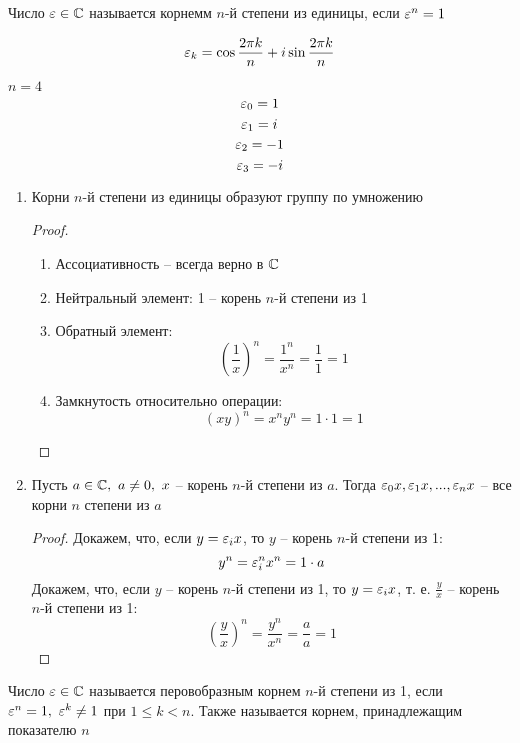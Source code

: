 \begin{definition}
    Число $ \varepsilon \in \mathbb{C} $ называется корнемм $n$-й степени из единицы, если $ \varepsilon^n = 1 $
\end{definition}

\begin{notation}
    $$ \varepsilon_k = \cos \frac{2 \pi k}n + i \sin \frac{2 \pi k}n $$
\end{notation}

\begin{eg}
	$ n = 4 $
    $$ \varepsilon_0 = 1 $$
    $$ \varepsilon_1 = i $$
    $$ \varepsilon_2 = -1 $$
    $$ \varepsilon_3 = -i $$
\end{eg}

\begin{properties}
    \hfill
    \begin{enumerate}
    	\item Корни $n$-й степени из единицы образуют группу по умножению
        \begin{proof}
            \hfill
            \begin{enumerate}
                \item Ассоциативность -- всегда верно в $\mathbb{C}$
                \item Нейтральный элемент: 1 -- корень $n$-й степени из 1
                \item Обратный элемент:
                $$ (\frac1x)^n = \frac{1^n}{x^n} = \frac11 = 1 $$
                \item Замкнутость относительно операции:
                $$ (xy)^n = x^ny^n = 1 \cdot 1 = 1 $$
            \end{enumerate}
        \end{proof}
        \item Пусть $a \in \mathbb{C}, ~ a \ne 0, ~ x$ -- корень $n$-й степени из $a$. Тогда $\varepsilon_0x, \varepsilon_1x, ..., \varepsilon_nx $ -- все корни $n$ степени из $a$
        \begin{proof}
            Докажем, что, если $y = \varepsilon_ix$, то $y$ -- корень $n$-й степени из 1:
            $$ y^n = \varepsilon_i^nx^n = 1 \cdot a $$
            Докажем, что, если $y$ -- корень $n$-й степени из 1, то $y = \varepsilon_ix$, т. е. $\frac{y}x$ -- корень $n$-й степени из 1:
            $$ (\frac{y}x)^n = \frac{y^n}{x^n} = \frac{a}a = 1 $$
        \end{proof}
    \end{enumerate}
\end{properties}

\begin{definition}
	Число $\varepsilon \in \mathbb{C}$ называется перовобразным корнем $n$-й степени из 1, если $\varepsilon^n = 1, ~ \varepsilon^k \ne 1$ при $1 \le k < n $. Также называется корнем, принадлежащим показателю $n$
\end{definition}

